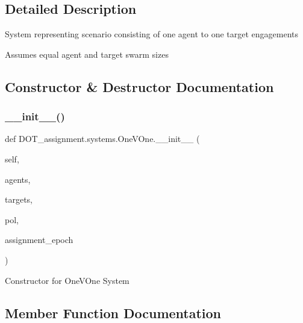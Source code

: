 \subsection{Detailed Description}
\begin{DoxyVerb}System representing scenario consisting of one agent to one target engagements

Assumes equal agent and target swarm sizes\end{DoxyVerb}
 

\subsection{Constructor \& Destructor Documentation}
\mbox{\label{class_d_o_t__assignment_1_1systems_1_1_one_v_one_af1b5a9b54110a79dbcd85f09ac343d7a}} 
\subsubsection{\texorpdfstring{\_\_init\_\_()}{\_\_init\_\_()}}
{\footnotesize\ttfamily def D\+O\+T\+\_\+assignment.\+systems.\+One\+V\+One.\+\_\+\+\_\+init\+\_\+\+\_\+ (\begin{DoxyParamCaption}\item[{}]{self,  }\item[{}]{agents,  }\item[{}]{targets,  }\item[{}]{pol,  }\item[{}]{assignment\+\_\+epoch }\end{DoxyParamCaption})}

\begin{DoxyVerb}Constructor for OneVOne System
\end{DoxyVerb}
 

\subsection{Member Function Documentation}
\mbox{\label{class_d_o_t__assignment_1_1systems_1_1_one_v_one_aa5b2a62d904ce5fbbc229c861c20c2b3}} 
